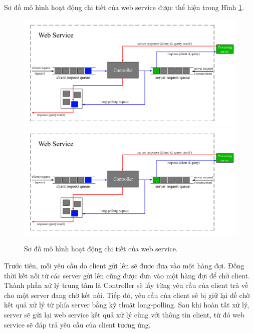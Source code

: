 Sơ đồ mô hình hoạt động chi tiết của web service được thể hiện trong Hình \ref{FigWS}.

\begin{figure}[!htbp]
  \begin{center}
    \leavevmode
    \ifpdf
      \includegraphics[scale=0.17]{ws_model}
    \else
      \includegraphics[scale=0.17]{ws_model}
    \fi
    \caption[Sơ đồ mô hình hoạt động chi tiết của web service]{Sơ đồ mô hình hoạt động chi tiết của web service.}
    \label{FigWS}
  \end{center}
\end{figure}

Trước tiên, mỗi yêu cầu do client gửi lên sẽ được đưa vào một hàng đợi. Đồng thời kết nối từ các server gửi lên cũng được đưa vào một hàng đợi để chờ client. Thành phần xử lý trung tâm là Controller sẽ lấy từng yêu cầu của client trả về cho một server đang chờ kết nối. Tiếp đó, yêu cầu của client sẽ bị giữ lại đề chờ kết quả xử lý từ phía server bằng kỹ thuật long-polling. Sau khi hoàn tất xử lý, server sẽ gửi lại web service kết quả xử lý cùng với thông tin client, từ đó web service sẽ đáp trả yêu cầu của client tương ứng.


